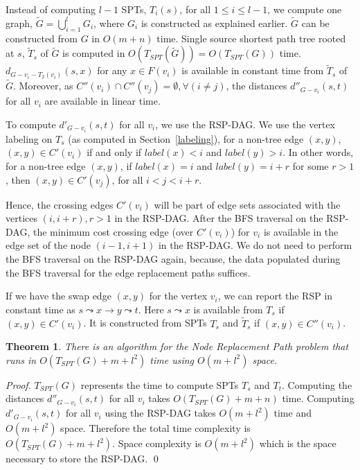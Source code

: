 \documentclass[11pt,a4paper]{llncs}
\newtheorem{thm}{Theorem}
\begin{document}
Instead of computing $l-1$ SPTs, $T_{i}(s)$, for all $1 \leq i \leq l-1$, we compute one graph,
$\widetilde{G} = \bigcup^{l}_{i=1}G_{i}$, where $G_{i}$ is constructed as explained earlier.
$\widetilde{G}$ can be constructed from $G$ in $O(m+n)$ time. Single source shortest path tree rooted at $s$,
$\widetilde{T}_{s}$ of $\widetilde{G}$ is computed in $O(T_{SPT}(\widetilde{G})) = O(T_{SPT}(G))$ time. $d_{G-v_{i}-T_{2}(v_{i})}(s,x)$
for any $x \in F(v_{i})$ is available in constant time from $\widetilde{T}_{s}$ of $\widetilde{G}$.
Moreover, as $C''(v_{i}) \cap C''(v_{j}) = \emptyset, \forall (i \neq j)$,
the distances $d''_{G-v_{i}}(s,t)$ for all $v_{i}$ are available in linear time.

To compute $d'_{G-v_{i}}(s,t)$ for all $v_{i}$, we use the RSP-DAG. We use the vertex labeling on $T_{s}$ (as computed in Section~\ref{labeling}),
for a non-tree edge $(x,y)$, $(x,y) \in C'(v_{i})$
if and only if $label(x) < i$ and $label(y) > i$. In other words, for a non-tree edge $(x,y)$, if $label(x) = i$
and $label(y) = i + r$ for some $r > 1$, then $(x,y) \in C'(v_{j})$, for all $i < j < i + r$.

Hence, the crossing edges $C'(v_{i})$ will be part
of edge sets associated with the vertices $(i, i+r), r > 1$ in the RSP-DAG. After the BFS traversal on the RSP-DAG,
the minimum cost crossing edge (over $C'(v_{i})$) for $v_{i}$ is available in the edge set of the node $(i-1, i+1)$ in the RSP-DAG.
We do not need to perform the BFS traversal on the RSP-DAG again, because, the data populated during the BFS traversal for the edge replacement
paths suffices.

If we have the swap edge $(x, y)$ for the vertex $v_{i}$,
we can report the RSP in constant time as $s \leadsto x \rightarrow y \leadsto t$. Here $s \leadsto x$
is available from $T_{s}$ if $(x, y) \in C'(v_{i})$. It is constructed from SPTs $T_{s}$ and $\widetilde{T}_{s}$  if
$(x, y) \in C''(v_{i})$.

\begin{thm}
\label{thm3}
There is an algorithm for the
Node Replacement Path problem that runs in $O(T_{SPT}(G) + m + l^2)$ time using $O(m + l^2)$ space.
\end{thm}

\begin{proof}
$T_{SPT}(G)$ represents the time to compute SPTs $T_{s}$ and $T_{t}$.
Computing the distances $d''_{G-v_{i}}(s,t)$ for all $v_{i}$ takes $O(T_{SPT}(G) + m + n)$ time.
Computing $d'_{G-v_{i}}(s,t)$ for all $v_{i}$ using the RSP-DAG takes $O(m + l^2)$ time
and $O(m + l^2)$ space. Therefore the total time complexity is $O(T_{SPT}(G) + m + l^2)$.
Space complexity is $O(m + l^2)$ which is the space necessary to store the RSP-DAG.
\qed
\end{proof}
\end{document}
